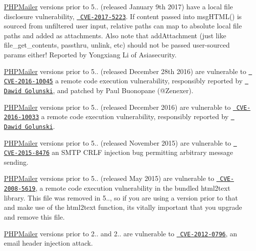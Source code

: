 \mbox{\hyperlink{namespace_p_h_p_mailer}{PHPMailer}} versions prior to 5.. (released January 9th 2017) have a local file disclosure vulnerability, \href{https://web.nvd.nist.gov/view/vuln/detail?vulnId=CVE-2017-5223}{\texttt{ CVE-\/2017-\/5223}}. If content passed into {\ttfamily msg\+HTML()} is sourced from unfiltered user input, relative paths can map to absolute local file paths and added as attachments. Also note that {\ttfamily add\+Attachment} (just like {\ttfamily file\+\_\+get\+\_\+contents}, {\ttfamily passthru}, {\ttfamily unlink}, etc) should not be passed user-\/sourced params either! Reported by Yongxiang Li of Asiasecurity.

\mbox{\hyperlink{namespace_p_h_p_mailer}{PHPMailer}} versions prior to 5.. (released December 28th 2016) are vulnerable to \href{https://web.nvd.nist.gov/view/vuln/detail?vulnId=CVE-2016-10045}{\texttt{ CVE-\/2016-\/10045}} a remote code execution vulnerability, responsibly reported by \href{https://legalhackers.com/advisories/PHPMailer-Exploit-Remote-Code-Exec-CVE-2016-10045-Vuln-Patch-Bypass.html}{\texttt{ Dawid Golunski}}, and patched by Paul Buonopane (@\+Zenexer).

\mbox{\hyperlink{namespace_p_h_p_mailer}{PHPMailer}} versions prior to 5.. (released December 2016) are vulnerable to \href{https://web.nvd.nist.gov/view/vuln/detail?vulnId=CVE-2016-10033}{\texttt{ CVE-\/2016-\/10033}} a remote code execution vulnerability, responsibly reported by \href{http://legalhackers.com/advisories/PHPMailer-Exploit-Remote-Code-Exec-CVE-2016-10033-Vuln.html}{\texttt{ Dawid Golunski}}.

\mbox{\hyperlink{namespace_p_h_p_mailer}{PHPMailer}} versions prior to 5.. (released November 2015) are vulnerable to \href{https://web.nvd.nist.gov/view/vuln/detail?vulnId=CVE-2015-8476}{\texttt{ CVE-\/2015-\/8476}} an SMTP CRLF injection bug permitting arbitrary message sending.

\mbox{\hyperlink{namespace_p_h_p_mailer}{PHPMailer}} versions prior to 5.. (released May 2015) are vulnerable to \href{https://web.nvd.nist.gov/view/vuln/detail?vulnId=CVE-2008-5619}{\texttt{ CVE-\/2008-\/5619}}, a remote code execution vulnerability in the bundled html2text library. This file was removed in 5.., so if you are using a version prior to that and make use of the html2text function, it\textquotesingle{}s vitally important that you upgrade and remove this file.

\mbox{\hyperlink{namespace_p_h_p_mailer}{PHPMailer}} versions prior to 2.. and 2.. are vulnerable to \href{https://web.nvd.nist.gov/view/vuln/detail?vulnId=CVE-2012-0796}{\texttt{ CVE-\/2012-\/0796}}, an email header injection attack.

